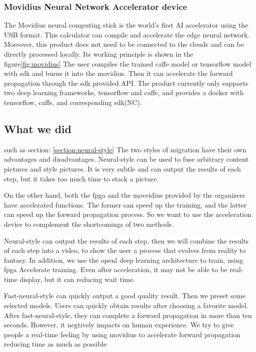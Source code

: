 \subsubsection{Movidius Neural Network Accelerator device}\label{sec:movidius}
The Movidius neural computing stick is the world's first AI accelerator using the USB format. This calculator can compile and accelerate the edge neural network. Moreover, this product does not need to be connected to the clouds and can be directly processed locally. Its working principle is shown in the figure\ref{fig:movidius}
The user compiles the trained caffe model or tensorflow model with sdk and burns it into the movidius. Then it can accelerate the forward propagation through the sdk provided API.
The product currently only supports two deep learning frameworks, tensorflow and caffe, and provides a docker with tensorflow, caffe, and corresponding sdk(NC).
\subsection{What we did}
such as section: \ref{section:neural-style} The two styles of migration have their own advantages and disadvantages. Neural-style can be used to fuse arbitrary content pictures and style pictures. It is very subtle and can output the results of each step, but it takes too much time to stack a picture. 

On the other hand, both the fpga and the moveidius provided by the organizers have accelerated functions. The former can speed up the training, and the latter can speed up the forward propagation process. So we want to use the acceleration device to complement the shortcomings of two methods.

Neural-style can output the results of each step, then we will combine the results of each step into a video, to show the user a process that evolves from reality to fantasy. In addition, we use the openl deep learning architecture to train, using fpga Accelerate training. Even after acceleration, it may not be able to be real-time display, but it can reducing wait time.

Fast-neural-style can quickly output a good quality result. Then we preset some selected models.
Users can quickly obtain results after choosing a favorite model. After fast-neural-style, they can complete a forward propagation in more than ten seconds.
However, it negtively impacts on human experience. We try to give people a real-time feeling by using movidius to accelerate forward propagation reducing time as much as possible

